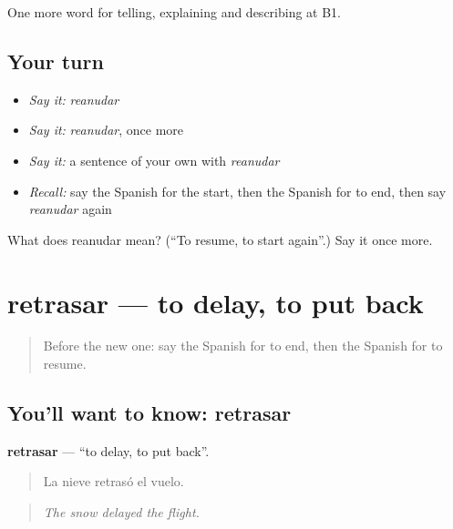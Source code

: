 \begin{grammarlens}[title={What you've built}]
One more word for telling, explaining and describing at B1.
\end{grammarlens}

\subsection*{Your turn}
\begin{itemize}
\raggedright
  \item \emph{Say it:} \emph{reanudar}
  \item \emph{Say it:} \emph{reanudar}, once more
  \item \emph{Say it:} a sentence of your own with \emph{reanudar}
  \item \emph{Recall:} say the Spanish for the start, then the Spanish for to end, then say \emph{reanudar} again
\end{itemize}

\begin{tcolorbox}[breakable,colback=teal!4,colframe=teal!35!black,title={Before you move on}]
What does reanudar mean? (\textquotedblleft{}To resume, to start again\textquotedblright{}.) Say it once more.
\end{tcolorbox}
\section[retrasar]{retrasar — to delay, to put back}

\label{lesson:ES-C543-retrasar}



\begin{quote}
Before the new one: say the Spanish for to end, then the Spanish for to resume.
\end{quote}

\subsection*{You'll want to know: retrasar}
\textbf{retrasar} — \textquotedblleft{}to delay, to put back\textquotedblright{}.

\begin{quote}
La nieve retrasó el vuelo.
\end{quote}

\begin{quote}
\emph{The snow delayed the flight.}
\end{quote}

